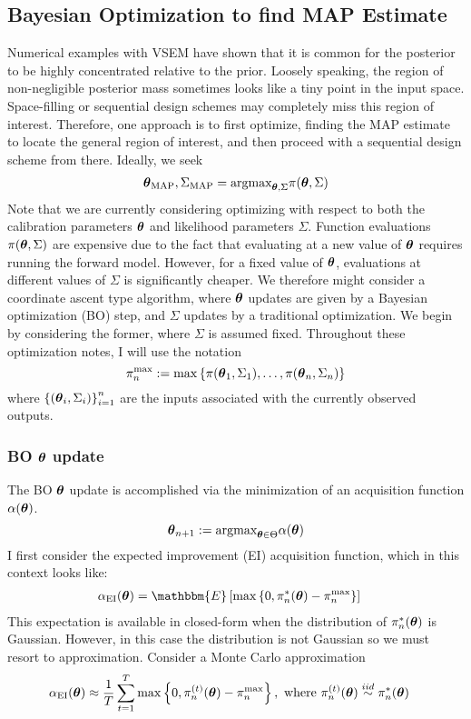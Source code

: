 \documentclass[12pt]{article}
\begin{document}
\subsection{Bayesian Optimization to find MAP Estimate}
Numerical examples with VSEM have shown that it is common for the posterior to be highly concentrated relative to the prior. Loosely speaking, the region of 
non-negligible posterior mass sometimes looks like a tiny point in the input space. Space-filling or sequential design schemes may completely miss this region 
of interest. Therefore, one approach is to first optimize, finding the MAP estimate to locate the general region of interest, and then proceed with a sequential 
design scheme from there. Ideally, we seek 
\begin{align*}
\boldsymbol{\theta}_{\text{MAP}}, \Sigma_{\text{MAP}} = \text{argmax}_{\boldsymbol{\theta}, \Sigma} \pi(\boldsymbol{\theta}, \Sigma)
\end{align*}
Note that we are currently considering optimizing with respect to both the calibration parameters $\boldsymbol{\theta}$ and likelihood parameters $\Sigma$. 
Function evaluations $\pi(\boldsymbol{\theta}, \Sigma)$ are expensive due to the fact that evaluating at a new value of $\boldsymbol{\theta}$ requires running the forward 
model. However, for a fixed value of $\boldsymbol{\theta}$, evaluations at different values of $\Sigma$ is significantly cheaper. We therefore might consider 
a coordinate ascent type algorithm, where $\boldsymbol{\theta}$ updates are given by a Bayesian optimization (BO) step, and $\Sigma$ updates by a traditional 
optimization. We begin by considering the former, where $\Sigma$ is assumed fixed. Throughout these optimization notes, I will use the notation 
\[\pi_n^{\max} := \max\left\{\pi(\boldsymbol{\theta}_1, \Sigma_1), \dots, \pi(\boldsymbol{\theta}_n, \Sigma_n) \right\}\]
where $\left\{(\boldsymbol{\theta}_i, \Sigma_i) \right\}_{i = 1}^{n}$ are the inputs associated with the currently observed outputs. 

\subsubsection{BO $\boldsymbol{\theta}$ update}
The BO $\boldsymbol{\theta}$ update is accomplished via the minimization of an acquisition function $\alpha(\boldsymbol{\theta})$. 
\[\boldsymbol{\theta}_{n+1} := \text{argmax}_{\boldsymbol{\theta} \in \Theta} \alpha(\boldsymbol{\theta}) \]
I first consider the expected improvement (EI) acquisition function, which in 
this context looks like: 
\begin{align*}
\alpha_{\text{EI}}(\bpar) &= \mathbbm{E}\left[\max\left\{0, \postDens_n^*(\bpar) - \postDens_n^{\max} \right\} \right]
\end{align*}
This expectation is available in closed-form when the distribution of $\pi_n^*(\boldsymbol{\theta})$ is Gaussian. However, in this case the distribution is not Gaussian so 
we must resort to approximation. Consider a Monte Carlo approximation 
\begin{align*}
\alpha_{\text{EI}}(\boldsymbol{\theta}) &\approx \frac{1}{T} \sum_{t = 1}^{T} \max\left\{0, \pi^{(t)}_n(\boldsymbol{\theta}) - \pi_n^{\max}\right\}, \text{ where } \pi^{(t)}_n(\boldsymbol{\theta}) \overset{iid}{\sim} \pi_n^*(\boldsymbol{\theta})
\end{align*}
\end{document}
